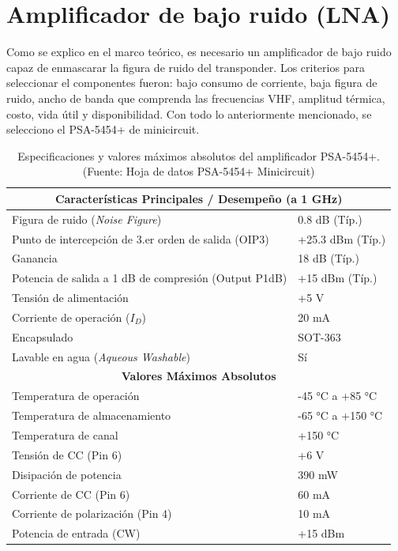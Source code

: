 \documentclass[11pt,a4paper,twoside]{report}
\begin{document}
	\section{Amplificador de bajo ruido (LNA)}
	Como se explico en el marco teórico, es necesario un amplificador de bajo ruido capaz de enmascarar la figura de ruido del transponder. Los criterios para seleccionar el componentes fueron: bajo consumo de corriente, baja figura de ruido, ancho de banda que comprenda las frecuencias VHF, amplitud térmica, costo, vida útil y disponibilidad. Con todo lo anteriormente mencionado, se selecciono el PSA-5454+ de minicircuit.
	\begin{table}[htbp]
		\centering
		\label{tab:psa5454_caracteristicas}
		\begin{tabular}{|l|l|}
			\hline
			\multicolumn{2}{|c|}{\textbf{Características Principales / Desempeño (a 1 GHz)}} \\
			\hline
			Figura de ruido (\textit{Noise Figure}) & 0.8 dB (Típ.) \\
			Punto de intercepción de 3.er orden de salida (OIP3) & +25.3 dBm (Típ.) \\
			Ganancia & 18 dB (Típ.) \\
			Potencia de salida a 1 dB de compresión (Output P1dB) & +15 dBm (Típ.) \\
			Tensión de alimentación & +5 V  \\
			Corriente de operación ($I_D$) & 20 mA \\
			Encapsulado & SOT-363  \\
			Lavable en agua (\textit{Aqueous Washable}) & Sí \\
			\hline
			\multicolumn{2}{|c|}{\textbf{Valores Máximos Absolutos}} \\
			\hline
			Temperatura de operación & -45 °C a +85 °C \\
			Temperatura de almacenamiento & -65 °C a +150 °C \\
			Temperatura de canal & +150 °C \\
			Tensión de CC (Pin 6) & +6 V \\
			Disipación de potencia & 390 mW \\
			Corriente de CC (Pin 6) & 60 mA \\
			Corriente de polarización (Pin 4) & 10 mA \\
			Potencia de entrada (CW) & +15 dBm \\
			\hline
		\end{tabular}
		\caption{Especificaciones y valores máximos absolutos del amplificador PSA-5454+. (Fuente: Hoja de datos PSA-5454+ Minicircuit)}
	\end{table}
	
\end{document}
